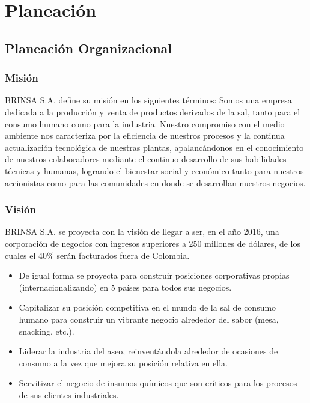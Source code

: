 \chapter{Planeaci\'on}
\section{Planeaci\'on Organizacional}
\subsection{Misi\'on}
BRINSA S.A. define su misi\'on en los siguientes t\'erminos: Somos una empresa dedicada a la producci\'on y venta de productos derivados de la sal, tanto para el consumo humano como para la industria. Nuestro compromiso con el medio ambiente nos caracteriza por la eficiencia de nuestros procesos y la continua actualizaci\'on tecnol\'ogica de nuestras plantas, apalanc\'andonos en el conocimiento de nuestros colaboradores mediante el continuo desarrollo de sus habilidades t\'ecnicas y humanas, logrando el bienestar social y econ\'omico tanto para nuestros accionistas como para las comunidades en donde se desarrollan nuestros negocios.%
%
\subsection{Visi\'on}
BRINSA S.A. se proyecta con la visi\'on de llegar a ser, en el a\~no 2016, una corporaci\'on de negocios con ingresos superiores a 250 millones de d\'olares, de los cuales el 40\% ser\'an facturados fuera de Colombia.\\%
\begin{itemize}
	\item De igual forma se proyecta para construir posiciones corporativas propias (internacionalizando) en 5 pa\'ises para todos sus negocios.%
	\item Capitalizar su posici\'on competitiva en el mundo de la sal de consumo humano para construir un vibrante negocio alrededor del sabor (mesa, snacking, etc.).%
	\item Liderar la industria del aseo, reinvent\'andola alrededor de ocasiones de consumo a la vez que mejora su posici\'on relativa en ella.%
	\item Servitizar el negocio de insumos qu\'imicos que son cr\'iticos para los procesos de sus clientes industriales.%
\end{itemize}%
%
